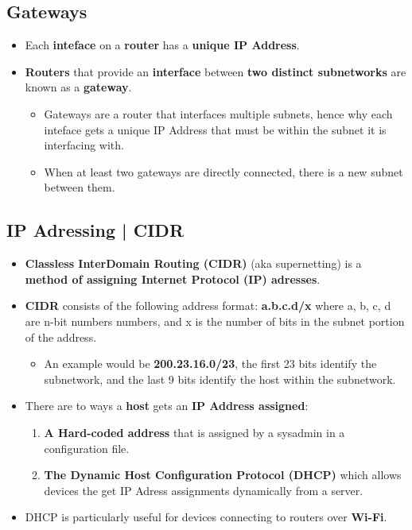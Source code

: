 \documentclass{article}
\begin{document}
    \subsection*{Gateways}
    \begin{itemize}
        \item Each \textbf{inteface} on a \textbf{router} has a \textbf{unique IP Address}.
        \item \textbf{Routers} that provide an \textbf{interface} between \textbf{two distinct subnetworks} are known as a \textbf{gateway}.
        \begin{itemize}
            \item Gateways are a router that interfaces multiple subnets, hence why each inteface gets a unique IP Address that must be within the subnet it is interfacing with.
            \item When at least two gateways are directly connected, there is a new subnet between them.
        \end{itemize}
    \end{itemize}

    \subsection*{IP Adressing | CIDR}
    \begin{itemize}
        \item \textbf{Classless InterDomain Routing (CIDR)} (aka supernetting) is a \textbf{method of assigning Internet Protocol (IP) adresses}.
        \item \textbf{CIDR} consists of the following address format: \textbf{a.b.c.d/x} where a, b, c, d are n-bit numbers numbers, and x is the number of bits in the subnet portion of the address.
        \begin{itemize}
            \item An example would be \textbf{200.23.16.0/23}, the first 23 bits identify the subnetwork, and the last 9 bits identify the host within the subnetwork.
        \end{itemize}
        \item There are to ways a \textbf{host} gets an \textbf{IP Address assigned}:
        \begin{enumerate}
            \item \textbf{A Hard-coded address} that is assigned by a sysadmin in a configuration file.
            \item \textbf{The Dynamic Host Configuration Protocol (DHCP)} which allows devices the get IP Adress assignments dynamically from a server.
        \end{enumerate} 
        \item DHCP is particularly useful for devices connecting to routers over \textbf{Wi-Fi}. 
    \end{itemize}
    
\end{document}
